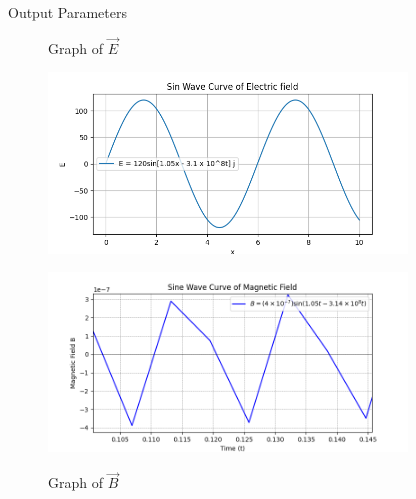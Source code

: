 \documentclass[journal,12pt,twocolumn]{IEEEtran}
\theoremstyle{remark}
\begin{document}
\begin{flushleft}
    \begin{table}[ht]
        \caption{Output Parameters}
        
        \label{tab:table3.12.8.8}
    \end{table}
\end{flushleft}

\newpage

\renewcommand{\thefigure}{\theenumi}
\renewcommand{\thetable}{\theenumi}

\begin{flushleft}

\begin{figure}[ht]
\renewcommand\thefigure{1}
  \caption{Graph of $\vec{E}$}
  \includegraphics[width=0.85\textwidth]{figs/fig1.png}
  \label{fig:fig1.12.8.8}

    \renewcommand\thefigure{2}
    \caption{Graph of $\vec{B}$}
    \includegraphics[width=0.85\textwidth]{figs/fig2.png}
    \label{fig:fig2.12.8.8}
\end{figure}

\end{flushleft}
\end{document}
